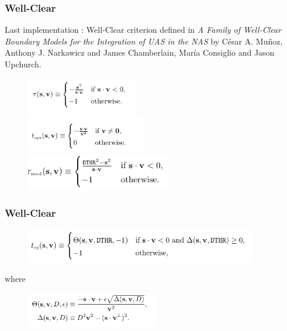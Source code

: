 \documentclass{beamer}
\begin{document}
\begin{frame}[fragile]
	\frametitle{Well-Clear}
	
	Last implementation : Well-Clear criterion defined in \textit{A Family of Well-Clear Boundary Models for the Integration of UAS in the NAS} by C\'esar A. Mu\~{n}oz, Anthony J. Narkawicz and James Chamberlain, Mar\'ia Consiglio and Jason Upchurch.
	
	\begin{figure}
		\includegraphics[height=16mm]{images/WCV/tau.pdf}\\
		\includegraphics[height=16mm]{images/WCV/tcpa.pdf}\\
		\includegraphics[height=16mm]{images/WCV/taumod.pdf}\\
	\end{figure}
	

\end{frame}

\begin{frame}[fragile]
	\frametitle{Well-Clear}

	
	\begin{figure}
		\includegraphics[height=15mm]{images/WCV/tep.pdf}\\
	\end{figure}
		where
	\begin{figure}
		\includegraphics[height=15mm]{images/WCV/theta.pdf}\\
	\end{figure}
	
\end{frame}
\end{document}
